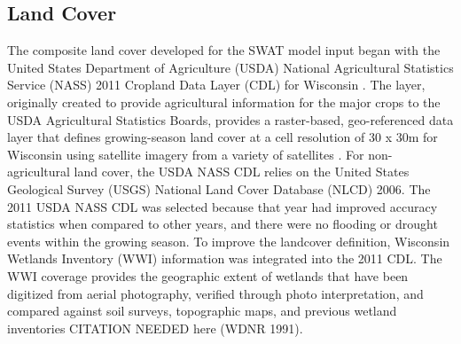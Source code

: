 \subsection{Land Cover}\label{sec:land_cover}
The composite land cover developed for the SWAT model input began with the United States Department of Agriculture (USDA) National Agricultural Statistics Service (NASS) 2011 Cropland Data Layer (CDL) for Wisconsin . The layer, originally created to provide agricultural information for the major crops to the USDA Agricultural Statistics Boards, provides a raster-based, geo-referenced data layer that defines growing-season land cover at a cell resolution of 30 x 30m for Wisconsin using satellite imagery from a variety of satellites . For non-agricultural land cover, the USDA NASS CDL relies on the United States Geological Survey (USGS) National Land Cover Database (NLCD) 2006. The 2011 USDA NASS CDL was selected because that year had improved accuracy statistics when compared to other years, and there were no flooding or drought events within the growing season. To improve the landcover definition, Wisconsin Wetlands Inventory (WWI) information was integrated into the 2011 CDL. The WWI coverage provides the geographic extent of wetlands that have been digitized from aerial photography, verified through photo interpretation, and compared against soil surveys, topographic maps, and previous wetland inventories CITATION NEEDED here (WDNR 1991).